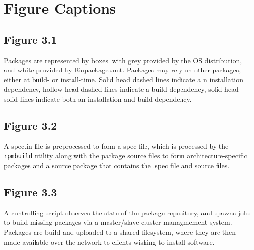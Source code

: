 \section{Figure Captions}

\subsection{Figure 3.1}

Packages are represented by
boxes, with grey provided by the OS distribution, and white provided by
Biopackages.net.  Packages may rely on other packages, either at build- or
install-time.  Solid head dashed lines indicate a n installation dependency,
hollow head dashed lines indicate a build dependency, solid head solid lines
indicate both an installation and build dependency.

\subsection{Figure 3.2}

A spec.in file is preprocessed to form
a spec file, which is processed by the \texttt{rpmbuild} utility along with the
package source files to form architecture-specific packages and a source
package that contains the .spec file and source files.

\subsection{Figure 3.3}

A controlling script
observes the state of the package repository, and spawns jobs to build missing
packages via a master/slave cluster managmement system.  Packages are build and
uploaded to a shared filesystem, where they are then made available over the
network to clients wishing to install software.


% 

